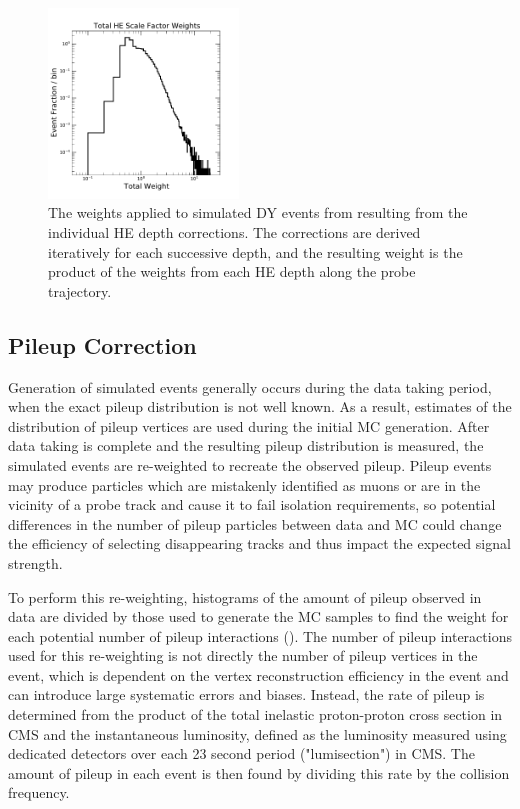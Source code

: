 \begin{figure}[htbp]
	\centering
	\includegraphics[width=0.45\textwidth]{figures/totalHEWeights.pdf}
	\caption[Applied HCAL Scale Factors]{The weights applied to simulated DY events from resulting from the individual HE depth corrections. The corrections are derived iteratively for each successive depth, and the resulting weight is the product of the weights from each HE depth along the probe trajectory.} 
        \label{fig:HESFs}
\end{figure}

\subsection{Pileup Correction}
Generation of simulated events generally occurs during the data taking period, when the exact pileup distribution is not well known.
As a result, estimates of the distribution of pileup vertices are used during the initial MC generation. 
After data taking is complete and the resulting pileup distribution is measured, the simulated events are re-weighted to recreate the observed pileup.
Pileup events may produce particles which are mistakenly identified as muons or are in the vicinity of a probe track and cause it to fail isolation requirements, so potential differences in the number of pileup particles between data and MC could change the efficiency of selecting disappearing tracks and thus impact the expected signal strength.

To perform this re-weighting, histograms of the amount of pileup observed in data are divided by those used to generate the MC samples to find the weight for each potential number of pileup interactions ().
The number of pileup interactions used for this re-weighting is not directly the number of pileup vertices in the event, which is dependent on the vertex reconstruction efficiency in the event and can introduce large systematic errors and biases.
Instead, the rate of pileup is determined from the product of the total inelastic proton-proton cross section in CMS and the instantaneous luminosity, defined as the luminosity measured using dedicated detectors over each 23 second period ("lumisection") in CMS.
The amount of pileup in each event is then found by dividing this rate by the collision frequency.

